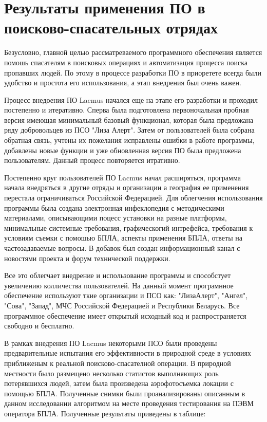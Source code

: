 \section{Результаты применения ПО в поисково-спасательных отрядах}

Безусловно, главной целью рассматреваемого программного обеспечения является помошь спасателям в поисковых операциях и автоматизация процесса поиска пропавших людей. По этому в процессе разработки ПО в приоретете всегда были удобство и простота его использования, а этап внедрения был очень важен.

Процесс внедоения ПО Lacmus начался еще на этапе его разработки и проходил постепенно и итеративно. Сперва была подготовлена первоночальная пробная версия имеющая минимальный базовый функционал, которая была предложана ряду добровольцев из ПСО "Лиза Алерт". Затем от пользователей была собрана обратная связь, учтены их пожелания исправлены ошибки в работе программы, добавлены новые функции и уже обновленная версия ПО была предложена пользователям. Данный процесс повторяется итративно. 

Постепенно круг пользователей ПО Lacmus начал расширяться, программа начала внедряться в другие отряды и организации а география ее применения перестала ограничиваться Российской Федерацией. Для облегчения использования программы была создана электронная инфеклопедия с методическими материалами, описывающими поцесс установки на разные платформы, минимальные системные требования, графическогий интрефейса, требования к условиям съемки с помошью БПЛА, аспекты применения БПЛА, ответы на частозадаваемые вопросы. В добавок был создан информационный канал с новостями проекта и форум технической поддержки.

Все это облегчает внедрение и использование программы и способстует увеличению колличества пользователей. На данный момент програмнное обеспечение используют ткие организации и ПСО как: "ЛизаАлерт", "Ангел", "Сова", "Запад", МЧС Российской Федерацией и Республики Беларусь. Все программное обеспечение имеет открытый исходный код и распространяется свободно и бесплатно.

В рамках внедрения ПО Lacmus некоторыми ПСО были проведены предварительные испытания его эффективности в природной среде в условиях приближеным к реальной поисково-спасателной операции. В природной местности было размещено несколько статистов выполняющих роль потерявшихся людей, затем была произведена аэрофотосъемка локации с помощью БПЛА. Полученные снимки были проанализированы описанным в данном исследовании алгоритмом на месте проведения тестирования на ПЭВМ оператора БПЛА. Полученные результаты приведены в таблице:

